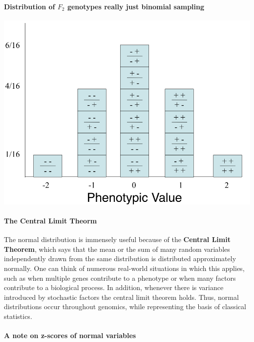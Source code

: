 \documentclass[]{book}
\let\oldparagraph\paragraph
\renewcommand{\paragraph}[1]{\oldparagraph{#1}\mbox{}}
\begin{document}
\hypertarget{distribution-of-f_2-genotypes-really-just-binomial-sampling}{%
\paragraph{\texorpdfstring{Distribution of \(F_2\) genotypes \textbar{} really just binomial sampling}{Distribution of F\_2 genotypes \textbar{} really just binomial sampling}}\label{distribution-of-f_2-genotypes-really-just-binomial-sampling}}

\begin{center}\includegraphics[width=0.7\linewidth]{images/week_2.018} \end{center}

\hypertarget{the-central-limit-theorm}{%
\paragraph{The Central Limit Theorm}\label{the-central-limit-theorm}}

The normal distribution is immensely useful because of the \textbf{Central Limit Theorem}, which says that the mean or the sum of many random variables independently drawn from the same distribution is distributed approximately normally. One can think of numerous real-world situations in which this applies, such as when multiple genes contribute to a phenotype or when many factors contribute to a biological process. In addition, whenever there is variance introduced by stochastic factors the central limit theorem holds. Thus, normal distributions occur throughout genomics, while representing the basis of classical statistics.

\hypertarget{a-note-on-z-scores-of-normal-variables}{%
\paragraph{A note on z-scores of normal variables}\label{a-note-on-z-scores-of-normal-variables}}
\end{document}
